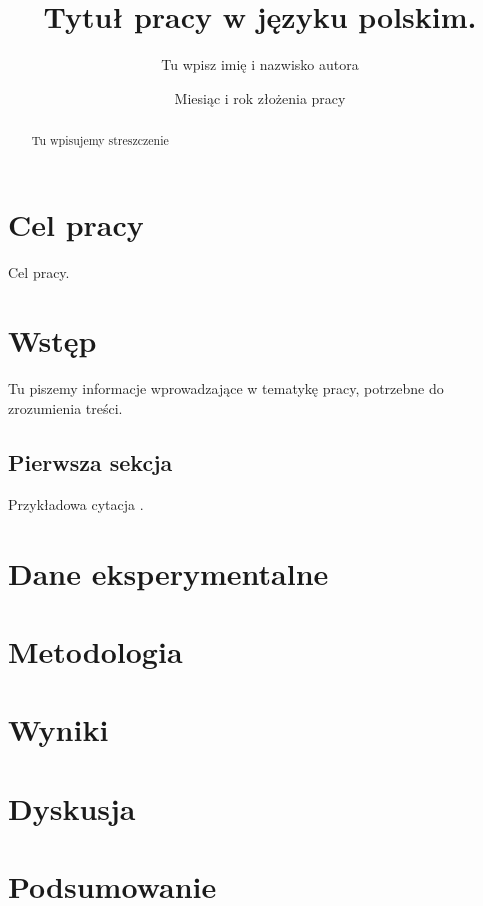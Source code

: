 \documentclass[licencjacka]{pracamgr_2}
\author{ Tu wpisz imię i nazwisko autora }
\title{ Tytuł pracy w języku polskim.}
\date{Miesiąc i rok złożenia pracy}
\begin{document}
\maketitle
\let\cleardoublepage\clearpage

\begin{abstract}
Tu wpisujemy streszczenie
\end{abstract}
\tableofcontents
\chapter*{Cel pracy}
Cel pracy.
\chapter{Wstęp}
Tu piszemy informacje wprowadzające w tematykę  pracy, potrzebne do zrozumienia treści.
\section{Pierwsza sekcja}
Przykładowa cytacja \citet{Shepherd}.
\chapter{Dane eksperymentalne}

\chapter{Metodologia}
\chapter{Wyniki}
\chapter{Dyskusja}
\chapter{Podsumowanie}

\end{document}
